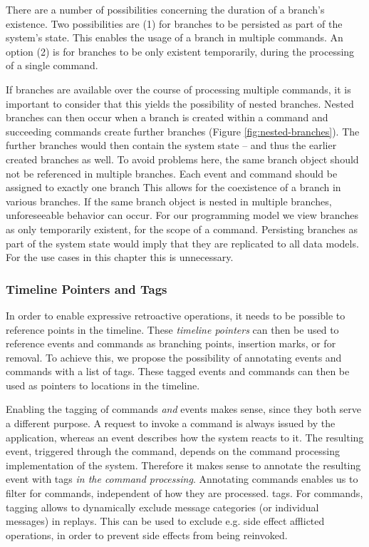 There are a number of possibilities concerning the duration of a branch's
existence. Two possibilities are (1) for branches to be persisted as part of 
the system's state. This enables the usage of a branch in multiple commands.
An option (2) is for branches to be only existent temporarily, during the 
processing of a single command. 

If branches are available over the course of processing multiple commands, it is
important to consider that this yields the possibility of nested branches.
Nested branches can then occur when a branch is created within a command and
succeeding commands create further branches (Figure \ref{fig:nested-branches}).
The further branches would then contain the system state -- and thus the
earlier created branches as well.
To avoid problems here, the same branch object should not be referenced in
multiple branches. Each event and command should be assigned to exactly one
branch
This allows for the coexistence of a branch in various branches. If the same 
branch object is nested in multiple branches, unforeseeable behavior can occur.
For our programming model we view branches as only temporarily existent,
for the scope of a command.
Persisting branches as part of the system state would imply that they are 
replicated to all data models. For the use cases in this chapter this is 
unnecessary.


\subsubsection{Timeline Pointers and Tags}
\label{sec:tags}
In order to enable expressive retroactive operations, it needs to be possible 
to reference points in the timeline. These \emph{timeline pointers} can then be 
used to reference events and commands as branching points, insertion marks, or 
for removal.
To achieve this, we propose the possibility of annotating events and commands 
with a list of tags. These tagged events and commands can then be used as 
pointers to locations in the timeline.

Enabling the tagging of commands \emph{and} events makes sense, since they both 
serve a different purpose. A request to invoke a command is always issued by the 
application, whereas an event describes how the system reacts to it.
The resulting event, triggered through the command, depends on the command
processing implementation of the system. Therefore it makes sense to annotate 
the resulting event with tags \emph{in the command processing}.
Annotating commands enables us to filter for commands, independent of how they
are processed. %
tags.
%
For commands, tagging allows to dynamically exclude message categories (or 
individual messages) in replays. This can be used to exclude e.g. side effect 
afflicted operations, in order to prevent side effects from being reinvoked.

